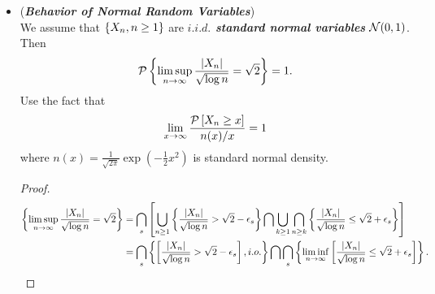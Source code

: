 \documentclass[11pt]{article}
\begin{document}
\begin{itemize}
\item \begin{example} (\emph{\textbf{Behavior of Normal Random Variables}}) \citep{resnick2013probability} \\
We assume that  $\left\{X_{n}, n\ge 1\right\}$ are \emph{\textbf{$i.i.d.$ standard normal variables}} ${\mathcal N}(0,1)$. Then 
\begin{align*}
{\mathcal P}\left\{\limsup\limits_{n\rightarrow \infty}\frac{\left\lvert X_{n} \right\rvert}{\sqrt{\log n}}= \sqrt{2}\right\} = 1.
\end{align*}
Use the fact that 
\begin{align*}
\lim\limits_{x\rightarrow \infty}\frac{{\mathcal P}\left[X_{n}\ge x\right]}{n(x)/x} = 1
\end{align*}
where $n(x)= \frac{1}{\sqrt{2\pi}}\exp(-\frac{1}{2}x^{2})$ is standard normal density.
\end{example}
\begin{proof}
\begin{align*}
\left\{\limsup\limits_{n\rightarrow \infty}\frac{\left\lvert X_{n} \right\rvert}{\sqrt{\log n}}= \sqrt{2}\right\} &= \bigcap_{s}\left[ \bigcup_{n\ge 1}\left\{\frac{\left\lvert X_{n} \right\rvert}{\sqrt{\log n}}>  \sqrt{2}-\epsilon_{s}\right\} \bigcap \bigcup_{k\ge 1}\bigcap_{n\ge k}\left\{\frac{\left\lvert X_{n} \right\rvert}{\sqrt{\log n}}\le  \sqrt{2}+\epsilon_{s}\right\} \right]\\
&=  \bigcap_{s}\left\{\left[\frac{\left\lvert X_{n} \right\rvert}{\sqrt{\log n}}>  \sqrt{2}-\epsilon_{s}\right], i.o.\right\} \bigcap \bigcap_{s}\left\{\liminf\limits_{n\rightarrow \infty}\left[\frac{\left\lvert X_{n} \right\rvert}{\sqrt{\log n}}\le  \sqrt{2}+\epsilon_{s}\right]\right\}. 
\end{align*}


\end{proof}
\end{itemize}
\end{document}
